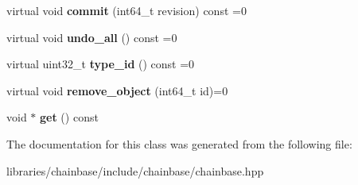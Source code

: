 \begin{DoxyCompactItemize}
virtual void {\bfseries commit} (int64\+\_\+t revision) const =0
\item 
\mbox{\label{classchainbase_1_1abstract__index_a2ad4109af3219e4dd6c06ccb580e0645}} 
virtual void {\bfseries undo\+\_\+all} () const =0
\item 
\mbox{\label{classchainbase_1_1abstract__index_af88f60ca72249096329fb9a59c4010ca}} 
virtual uint32\+\_\+t {\bfseries type\+\_\+id} () const =0
\item 
\mbox{\label{classchainbase_1_1abstract__index_ac61e9c755ddde5e123e43304dde40f1d}} 
virtual void {\bfseries remove\+\_\+object} (int64\+\_\+t id)=0
\item 
\mbox{\label{classchainbase_1_1abstract__index_a542c4391f24b181a94ac8815b4184541}} 
void $\ast$ {\bfseries get} () const
\end{DoxyCompactItemize}


The documentation for this class was generated from the following file\+:\begin{DoxyCompactItemize}
\item 
libraries/chainbase/include/chainbase/chainbase.\+hpp\end{DoxyCompactItemize}
